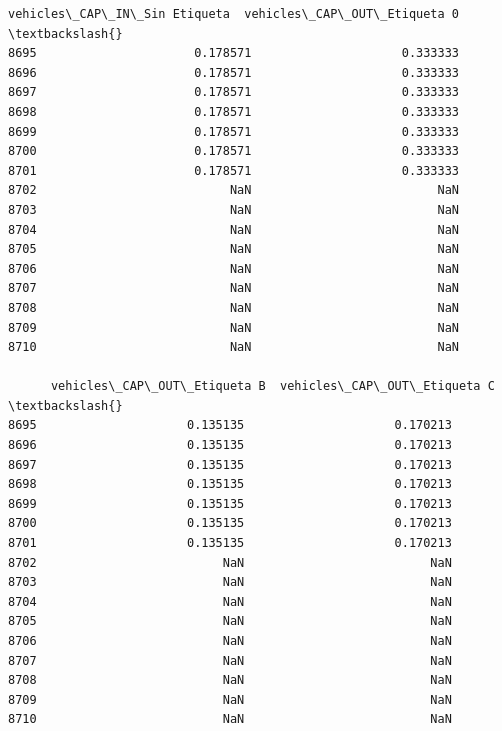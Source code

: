 \documentclass[11pt]{article}
\begin{document}
\begin{tcolorbox}[breakable, size=fbox, boxrule=.5pt, pad at break*=1mm, opacityfill=0]
\begin{Verbatim}[commandchars=\\\{\}]
      vehicles\_CAP\_IN\_Sin Etiqueta  vehicles\_CAP\_OUT\_Etiqueta 0  \textbackslash{}
8695                      0.178571                     0.333333
8696                      0.178571                     0.333333
8697                      0.178571                     0.333333
8698                      0.178571                     0.333333
8699                      0.178571                     0.333333
8700                      0.178571                     0.333333
8701                      0.178571                     0.333333
8702                           NaN                          NaN
8703                           NaN                          NaN
8704                           NaN                          NaN
8705                           NaN                          NaN
8706                           NaN                          NaN
8707                           NaN                          NaN
8708                           NaN                          NaN
8709                           NaN                          NaN
8710                           NaN                          NaN

      vehicles\_CAP\_OUT\_Etiqueta B  vehicles\_CAP\_OUT\_Etiqueta C  \textbackslash{}
8695                     0.135135                     0.170213
8696                     0.135135                     0.170213
8697                     0.135135                     0.170213
8698                     0.135135                     0.170213
8699                     0.135135                     0.170213
8700                     0.135135                     0.170213
8701                     0.135135                     0.170213
8702                          NaN                          NaN
8703                          NaN                          NaN
8704                          NaN                          NaN
8705                          NaN                          NaN
8706                          NaN                          NaN
8707                          NaN                          NaN
8708                          NaN                          NaN
8709                          NaN                          NaN
8710                          NaN                          NaN


\end{Verbatim}
\end{tcolorbox}
\end{document}
